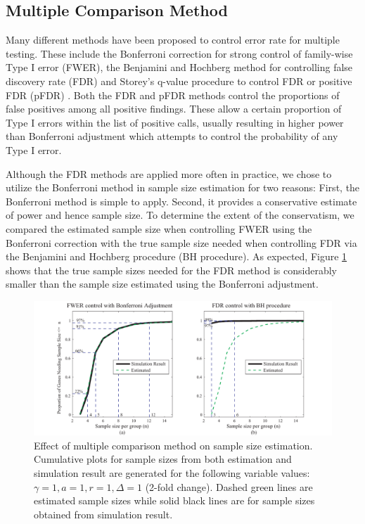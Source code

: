 \documentclass[12pt]{article}
\begin{document}
\subsection{Multiple Comparison Method}

Many different methods have been proposed to control error rate for
multiple testing.  These include the Bonferroni correction for
strong control of family-wise Type I error (FWER), the Benjamini
and
Hochberg \citeyearpar{Benjamini95} method for controlling false
discovery rate (FDR) and Storey's \citeyearpar{Storey02} q-value
procedure to control FDR or positive FDR (pFDR) .  Both the FDR and
pFDR methods control the proportions of false positives among all
positive findings.  These allow a certain proportion of Type I
errors within the list of positive calls, usually resulting in
higher power than Bonferroni adjustment which attempts to control
the probability of any Type I error.

Although the FDR methods are applied more often in practice, we
chose to utilize the Bonferroni method in sample size estimation for
two reasons: First, the Bonferroni method is simple to apply.
Second, it provides a conservative estimate of power and hence
sample size.  To determine the extent of the conservatism, we
compared the estimated sample size when controlling FWER using the
Bonferroni correction
with the true sample size needed when controlling FDR via the
Benjamini and Hochberg \citeyearpar{Benjamini95} procedure (BH
procedure). As
expected, Figure \ref{fig:ResMtd} shows that the true sample sizes
needed for the FDR method is considerably smaller than the sample
size estimated using the Bonferroni adjustment.

\begin{figure}%
  \caption[Effect of multiple comparison method on sample size
    estimation] {Effect of multiple comparison method on sample size
    estimation.  Cumulative plots for sample sizes from both
    estimation and simulation result are generated for the following
    variable values: $\gamma = 1, a = 1, r = 1, \Delta = 1$ (2-fold
    change). Dashed green lines are estimated sample sizes while solid
    black lines are for sample sizes obtained from simulation result.}
  \label{fig:ResMtd}
  \centerline{\includegraphics*[width=\textwidth]{ResMtd.pdf}}
\end{figure}
\end{document}
